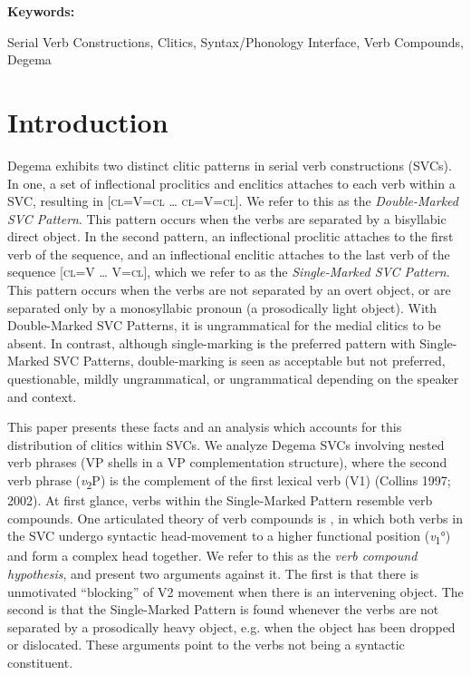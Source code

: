 \documentclass[output=paper]{langsci/langscibook}
\begin{document}
\begin{styleNoSpacing}\bfseries
Keywords:
\end{styleNoSpacing}

\begin{styleNoSpacing}
Serial Verb Constructions, Clitics, Syntax/Phonology Interface, Verb Compounds, Degema
\end{styleNoSpacing}

\chapter{Introduction}

Degema exhibits two distinct clitic patterns in serial verb constructions (SVCs). In one, a set of inflectional proclitics and enclitics attaches to each verb within a SVC, resulting in [\textsc{cl=}V\textsc{=cl} … \textsc{cl=}V\textsc{=cl}]. We refer to this as the \textit{Double-Marked SVC Pattern}. This pattern occurs when the verbs are separated by a bisyllabic direct object. In the second pattern, an inflectional proclitic attaches to the first verb of the sequence, and an inflectional enclitic attaches to the last verb of the sequence [\textsc{cl=}V … V\textsc{=cl}], which we refer to as the \textit{Single-Marked SVC Pattern}. This pattern occurs when the verbs are not separated by an overt object, or are separated only by a monosyllabic pronoun (a prosodically light object). With Double-Marked SVC Patterns, it is ungrammatical for the medial clitics to be absent. In contrast, although single-marking is the preferred pattern with Single-Marked SVC Patterns, double-marking is seen as acceptable but not preferred, questionable, mildly ungrammatical, or ungrammatical depending on the speaker and context. 

This paper presents these facts and an analysis which accounts for this distribution of clitics within SVCs. We analyze Degema SVCs involving nested verb phrases (VP shells in a VP complementation structure), where the second verb phrase (\textit{v}\textsubscript{2}P) is the complement of the first lexical verb (V1) (Collins 1997; 2002). At first glance, verbs within the Single-Marked Pattern resemble verb compounds. One articulated theory of verb compounds is \citet{Collins2002}, in which both verbs in the SVC undergo syntactic head-movement to a higher functional position (\textit{v}\textsubscript{1}°) and form a complex head together. We refer to this as the \textit{verb compound hypothesis}, and present two arguments against it. The first is that there is unmotivated “blocking” of V2 movement when there is an intervening object. The second is that the Single-Marked Pattern is found whenever the verbs are not separated by a prosodically heavy object, e.g. when the object has been dropped or dislocated. These arguments point to the verbs not being a syntactic constituent. 
\end{document}
